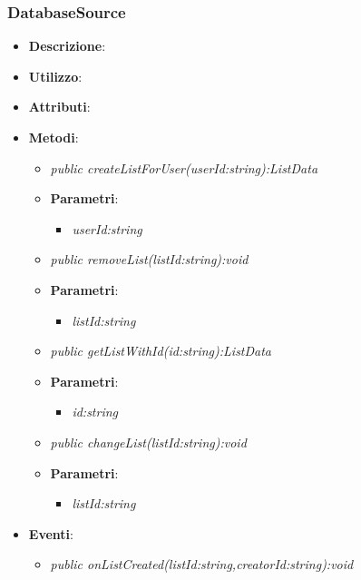 \subsubsection{DatabaseSource}
\begin{itemize}
\item \textbf{Descrizione}: 
\item \textbf{Utilizzo}: 
\item \textbf{Attributi}: 
\item \textbf{Metodi}:
	\begin{itemize}
	\item \textit{public createListForUser(userId:string):ListData}\\

			\item{\textbf{Parametri}: \begin{itemize}
			\item \textit{userId:string}\\

			\end{itemize}}
	\item \textit{public removeList(listId:string):void}\\

			\item{\textbf{Parametri}: \begin{itemize}
			\item \textit{listId:string}\\

			\end{itemize}}
	\item \textit{public getListWithId(id:string):ListData}\\

			\item{\textbf{Parametri}: \begin{itemize}
			\item \textit{id:string}\\

			\end{itemize}}
	\item \textit{public changeList(listId:string):void}\\

			\item{\textbf{Parametri}: \begin{itemize}
			\item \textit{listId:string}\\

			\end{itemize}}
	\end{itemize}
\item \textbf{Eventi}:
	\begin{itemize}
	\item \textit{public onListCreated(listId:string,creatorId:string):void}\\


\end{itemize}
\end{itemize}
